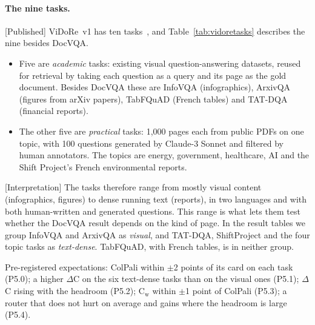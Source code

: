 \documentclass[11pt,a4paper]{article}
\newcommand{\lbl}[2]{\textsf{\scriptsize\textcolor{#1}{[#2]}}}
\newcommand{\Pub}{\lbl{tagP}{Published}}
\newcommand{\Int}{\lbl{tagI}{Interpretation}}
\newcommand{\Mea}{\lbl{tagM}{Measured}}
\newcommand{\file}[1]{\texttt{\small\hyphenchar\font=`\/ #1}}
\begin{document}
\paragraph{The nine tasks.} \Pub{} ViDoRe~v1 has ten tasks~\cite[\S3.1, Table~1]{colpali}, and Table~\ref{tab:vidoretasks} describes the nine besides DocVQA.
\begin{itemize}
  \item Five are \emph{academic} tasks: existing visual question-answering datasets, reused for retrieval by taking each question as a query and its page as the gold document. Besides DocVQA these are InfoVQA (infographics), ArxivQA (figures from arXiv papers), TabFQuAD (French tables) and TAT-DQA (financial reports).
  \item The other five are \emph{practical} tasks: 1,000 pages each from public PDFs on one topic, with 100 questions generated by Claude-3 Sonnet and filtered by human annotators. The topics are energy, government, healthcare, AI and the Shift Project's French environmental reports.
\end{itemize}
\Int{} The tasks therefore range from mostly visual content (infographics, figures) to dense running text (reports), in two languages and with both human-written and generated questions. This range is what lets them test whether the DocVQA result depends on the kind of page. In the result tables we group InfoVQA and ArxivQA as \emph{visual}, and TAT-DQA, ShiftProject and the four topic tasks as \emph{text-dense}. TabFQuAD, with French tables, is in neither group.

\begin{table}[!htbp]\centering\footnotesize\setlength{\tabcolsep}{4pt}

\caption{The nine further ViDoRe~v1 tasks used in post-hoc set 5. ``Synth.'' marks the four topic tasks with generated questions (the paper calls them Energy, Government, Healthcare and AI).}\label{tab:vidoretasks}
\end{table}

Pre-registered expectations: ColPali within $\pm$2 points of its card on each task (P5.0); a higher $\Delta$C on the six text-dense tasks than on the visual ones (P5.1); $\Delta$C rising with the headroom (P5.2); C$_\text{w}$ within $\pm$1 point of ColPali (P5.3); a router that does not hurt on average and gains where the headroom is large (P5.4).

\begin{table}[!htbp]\centering\small

\caption{\Mea{} Frozen DocVQA fusion settings on the nine other ViDoRe v1 tasks (\file{results/posthoc5/fusion.json}).}\label{tab:posthoc5}
\end{table}
\end{document}
